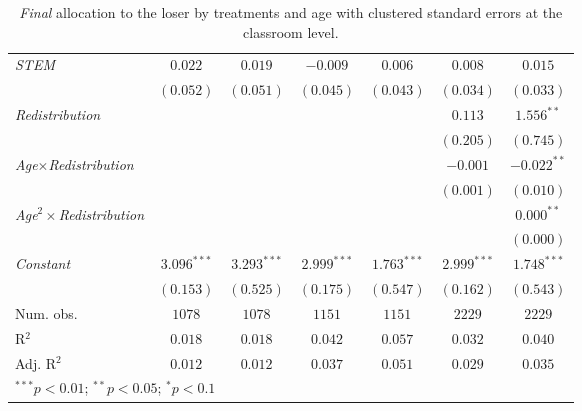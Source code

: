 \begin{table}[H]
\begin{center}
\begin{footnotesize}
\begin{tabular}{l c c c c c c}
\textit{STEM}                                 & $0.022$        & $0.019$        & $-0.009$       & $0.006$        & $0.008$        & $0.015$        \\
                                              & $(0.052)$      & $(0.051)$      & $(0.045)$      & $(0.043)$      & $(0.034)$      & $(0.033)$      \\
\textit{Redistribution}                       &                &                &                &                & $0.113$        & $1.556^{**}$   \\
                                              &                &                &                &                & $(0.205)$      & $(0.745)$      \\
\textit{Age}$\times$\textit{Redistribution}   &                &                &                &                & $-0.001$       & $-0.022^{**}$  \\
                                              &                &                &                &                & $(0.001)$      & $(0.010)$      \\
\textit{Age}$^2\times$\textit{Redistribution} &                &                &                &                &                & $0.000^{**}$   \\
                                              &                &                &                &                &                & $(0.000)$      \\
\textit{Constant}                             & $3.096^{***}$  & $3.293^{***}$  & $2.999^{***}$  & $1.763^{***}$  & $2.999^{***}$  & $1.748^{***}$  \\
                                              & $(0.153)$      & $(0.525)$      & $(0.175)$      & $(0.547)$      & $(0.162)$      & $(0.543)$      \\
\midrule
Num. obs.                                     & $1078$         & $1078$         & $1151$         & $1151$         & $2229$         & $2229$         \\
R$^2$                                         & $0.018$        & $0.018$        & $0.042$        & $0.057$        & $0.032$        & $0.040$        \\
Adj. R$^2$                                    & $0.012$        & $0.012$        & $0.037$        & $0.051$        & $0.029$        & $0.035$        \\
\bottomrule
\multicolumn{7}{l}{\footnotesize{$^{***}p<0.01$; $^{**}p<0.05$; $^{*}p<0.1$}}
\end{tabular}
\end{footnotesize}
\caption{\textit{Final} allocation to the loser by treatments and age with clustered standard errors at the classroom level.}
\label{table-b3-final-class}
\end{center}
\end{table}


